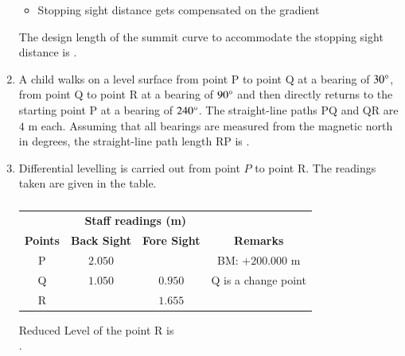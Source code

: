 \documentclass[journal,12pt,onecolumn]{article}
\theoremstyle{remark}
\begin{document}
\begin{enumerate}
\begin{itemize}
    \item Stopping sight distance gets compensated on the gradient
    \end{itemize}
    The design length of the summit curve  to accommodate the stopping sight
    distance is \underline{\hspace{2cm}} .
    
    \hfill{}
    
    \item A child walks on a level surface from point P to point Q at a bearing of $30\degree$, from
    point Q to point R at a bearing of $90\degree$ and then directly returns to the starting point P
    at a bearing of $240\degree$. The straight-line paths PQ and QR are $4$ m each. Assuming that
    all bearings are measured from the magnetic north in degrees, the straight-line path
    length RP  is \underline{\hspace{2cm}} .
    
    \hfill{}
    
    \item Differential levelling is carried out from point $P$  to point R.
    The readings taken are given in the table.
    \begin{table}[H]
        \centering
        \begin{tabular}{|c|c|c|c|}
        \hline
        & \multicolumn{2}{c|}{\textbf{Staff readings (m)}} & \\ \cline{2-3}
        \textbf{Points} & \textbf{Back Sight} & \textbf{Fore Sight} & \textbf{Remarks} \\ \hline
        P & \brak{\text{-}}$2.050$ & & BM: +$200.000$ m \\
        Q & $1.050$ & $0.950$ & Q is a change point \\
        R & & \brak{\text{-}}$1.655$ & \\ \hline
        \end{tabular}
        \caption{}
        \label{tab:q65}
    \end{table}
    Reduced Level  of the point R is \underline{\hspace{2cm}} \\ .
    
    \hfill{}

\end{enumerate}
\end{document}
